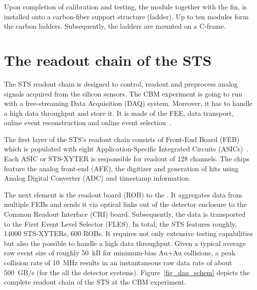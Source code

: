 Upon completion of calibration and testing, the module together with the fin, is installed onto a carbon-fiber support structure (ladder). Up to ten modules form the carbon ladders. Subsequently, the ladders are mounted on a C-frame.

\section{The readout chain of the STS}
\label{readout}
\label{DAQ}
The \gls{STS} readout chain is designed to control, readout and preprocess analog signals acquired from the silicon sensors. The \gls{CBM} experiment is going to run with a free-streaming Data Acquisition (\gls{DAQ}) system. Moreover, it has to handle a high data throughput and store it. It is made of the \gls{FEE}, data transport, online event reconstruction and online event selection~\cite{Kasinski1}.

The first layer of the \gls{STS}'s readout chain consists of Front-End Board (\gls{FEB}) which is populated with eight Application-Specific Integrated Circuits (ASICs)~\cite{Kasinski2}. Each ASIC or STS-XYTER is responsible for readout of 128 channels. The chips feature the analog front-end (\gls{AFE}), the digitizer and generation of hits using Analog Digital Converter (\gls{ADC}) and timestamp information. 

The next element is the readout board (\gls{ROB}) to the . It aggregates data from multiple \glspl{FEB} and sends it via optical links out of the detector enclosure to the Common Readout Interface (\gls{CRI}) board. Subsequently, the data is transported to the First Event Level Selector (\gls{FLES}). 
\newpage
In total, the \gls{STS} features roughly, 14000 STS-XYTERs, 600 \glspl{ROB}. It requires not only extensive testing capabilities but also the possible to handle a high data throughput. Given a typical average raw event size of roughly 50~kB for minimum-bias Au+Au collisions, a peak collision rate of 10~MHz results in an instantaneous raw data rate of about 500~GB/s (for the all the detector systems). Figure~\ref{fig_daq_schem} depicts the complete readout chain of the \gls{STS} at the \gls{CBM} experiment. 

